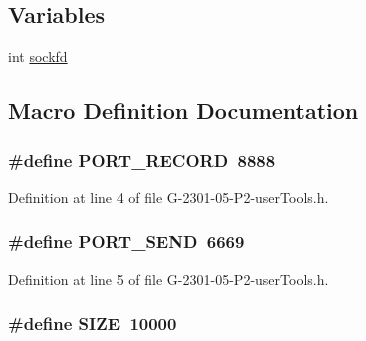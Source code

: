 \subsection*{Variables}
\begin{DoxyCompactItemize}
\item 
int \hyperlink{_g-2301-05-_p2-user_tools_8h_ad2c8fb3df3a737e0685e902870a611d2}{sockfd}
\end{DoxyCompactItemize}


\subsection{Macro Definition Documentation}
\hypertarget{_g-2301-05-_p2-user_tools_8h_a403f3d61e6c0872cda3700219ca9ac1e}{
\subsubsection[{P\-O\-R\-T\-\_\-\-R\-E\-C\-O\-R\-D}]{\setlength{\rightskip}{0pt plus 5cm}\#define P\-O\-R\-T\-\_\-\-R\-E\-C\-O\-R\-D~8888}}\label{_g-2301-05-_p2-user_tools_8h_a403f3d61e6c0872cda3700219ca9ac1e}


Definition at line 4 of file G-\/2301-\/05-\/\-P2-\/user\-Tools.\-h.

\hypertarget{_g-2301-05-_p2-user_tools_8h_a40c5426015ecc21e39dfb362eb4c0c14}{
\subsubsection[{P\-O\-R\-T\-\_\-\-S\-E\-N\-D}]{\setlength{\rightskip}{0pt plus 5cm}\#define P\-O\-R\-T\-\_\-\-S\-E\-N\-D~6669}}\label{_g-2301-05-_p2-user_tools_8h_a40c5426015ecc21e39dfb362eb4c0c14}


Definition at line 5 of file G-\/2301-\/05-\/\-P2-\/user\-Tools.\-h.

\hypertarget{_g-2301-05-_p2-user_tools_8h_a70ed59adcb4159ac551058053e649640}{
\subsubsection[{S\-I\-Z\-E}]{\setlength{\rightskip}{0pt plus 5cm}\#define S\-I\-Z\-E~10000}}\label{_g-2301-05-_p2-user_tools_8h_a70ed59adcb4159ac551058053e649640}


